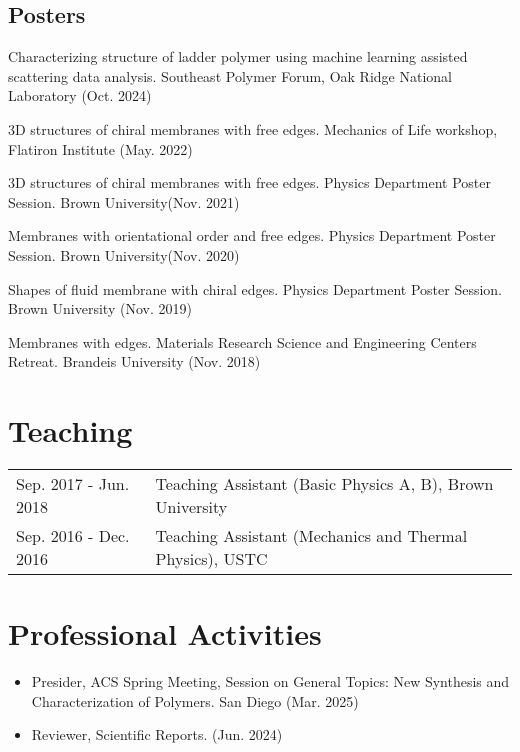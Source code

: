 \documentclass[11pt,letterpaper]{article}
\begin{document}
\subsection*{Posters}
\begin{etaremune}
    \item Characterizing structure of ladder polymer using machine learning assisted scattering data analysis. Southeast Polymer Forum, Oak Ridge National Laboratory (Oct. 2024)
    \item 3D structures of chiral membranes with free edges. Mechanics of Life workshop, Flatiron Institute (May. 2022)
    \item 3D structures of chiral membranes with free edges. Physics Department Poster Session. Brown University(Nov. 2021)
    \item Membranes with orientational order and free edges. Physics Department Poster Session. Brown University(Nov. 2020)
    \item Shapes of fluid membrane with chiral edges. Physics Department Poster Session. Brown University (Nov. 2019)
    \item Membranes with edges. Materials Research Science and Engineering Centers Retreat. Brandeis University (Nov. 2018)
\end{etaremune}



\section*{Teaching}
\vspace*{-0.15in}
\begin{longtable}{l p{\linewidth}}
    Sep. 2017 - Jun. 2018    & Teaching Assistant (Basic Physics A, B), Brown University \\
    Sep. 2016 - Dec. 2016    & Teaching Assistant (Mechanics and Thermal Physics), USTC
\end{longtable}

\section*{Professional Activities}
\vspace*{-0.15in}
\begin{itemize}
    \item Presider, ACS Spring Meeting, Session on General Topics: New Synthesis and Characterization of Polymers. San Diego (Mar. 2025)
    \item Reviewer, Scientific Reports. (Jun. 2024)
\end{itemize}
\end{document}
